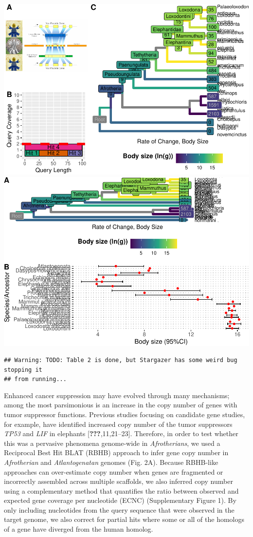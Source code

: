 \documentclass[10pt,letterpaper]{article}
\begin{document}
\includegraphics{paper_PLOS_draft_files/figure-latex/Figure 2C1-1.pdf}
\includegraphics{paper_PLOS_draft_files/figure-latex/Figure 2C2-1.pdf}

\begin{verbatim}
## Warning: TODO: Table 2 is done, but Stargazer has some weird bug stopping it
## from running...
\end{verbatim}

Enhanced cancer suppression may have evolved through many mechanisms;
among the most parsimonious is an increase in the copy number of genes
with tumor suppressor functions. Previous studies focusing on candidate
gene studies, for example, have identified increased copy number of the
tumor suppressors \emph{TP53} and \emph{LIF} in elephants
{[}{\textbf{???}},11,21--23{]}. Therefore, in order to test whether this
was a pervasive phenomena genome-wide in \emph{Afrotherians}, we used a
Reciprocal Best Hit BLAT (RBHB) approach to infer gene copy number in
\emph{Afrotherian} and \emph{Atlantogenatan} genomes (Fig. 2A). Because
RBHB-like approaches can over-estimate copy number when genes are
fragmented or incorrectly assembled across multiple scaffolds, we also
inferred copy number using a complementary method that quantifies the
ratio between observed and expected gene coverage per nucleotide (ECNC)
(Supplementary Figure 1). By only including nucleotides from the query
sequence that were observed in the target genome, we also correct for
partial hits where some or all of the homologs of a gene have diverged
from the human homolog.
\end{document}
